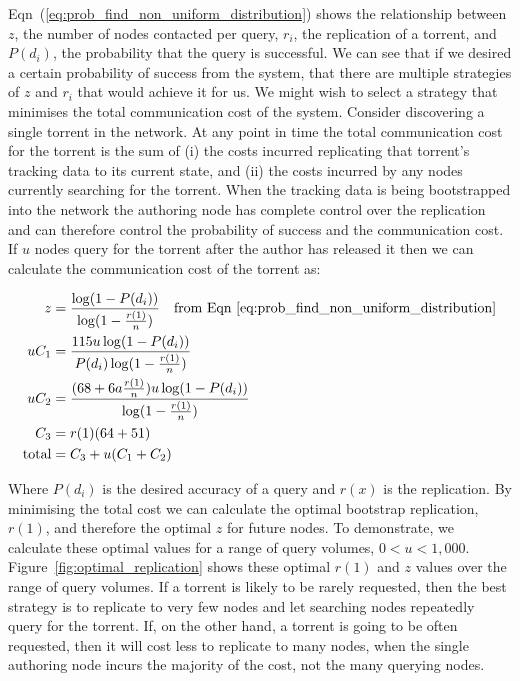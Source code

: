     Eqn~(\ref{eq:prob_find_non_uniform_distribution}) shows the relationship between $z$, the number of nodes contacted per query, $r_i$, the replication of a torrent, and $P(d_i)$, the probability that the query is successful. We can see that if we desired a certain probability of success from the system, that there are multiple strategies of $z$ and $r_i$ that would achieve it for us. We might wish to select a strategy that minimises the total communication cost of the system. Consider discovering a single torrent in the network. At any point in time the total communication cost for the torrent is the sum of (i) the costs incurred replicating that torrent's tracking data to its current state, and (ii) the costs incurred by any nodes currently searching for the torrent. When the tracking data is being bootstrapped into the network the authoring node has complete control over the replication and can therefore control the probability of success and the communication cost. If $u$ nodes query for the torrent after the author has released it then we can calculate the communication cost of the torrent as:

    \begin{align}
                     z &= \frac{\log(1-P(d_i))}{\log(1-\frac{r(1)}{n})} \quad \textrm{from Eqn~\ref{eq:prob_find_non_uniform_distribution}}\\
                  uC_1 &= \frac{115u\log(1-P(d_i))}{P(d_i)\log(1-\frac{r(1)}{n})}\\
                  uC_2 &= \frac{(68 + 6a\frac{r(1)}{n})u\log(1-P(d_i))}{\log(1-\frac{r(1)}{n})} \\
                   C_3 &= r(1)(64+51) \\
        \textrm{total} &= C_3 + u(C_1+C_2)
    \end{align}

    Where $P(d_i)$ is the desired accuracy of a query and $r(x)$ is the replication. By minimising the total cost we can calculate the optimal bootstrap replication, $r(1)$, and therefore the optimal $z$ for future nodes. To demonstrate, we calculate these optimal values for a range of query volumes, $0<u<1,000$. Figure~\ref{fig:optimal_replication} shows these optimal $r(1)$ and $z$ values over the range of query volumes. If a torrent is likely to be rarely requested, then the best strategy is to replicate to very few nodes and let searching nodes repeatedly query for the torrent. If, on the other hand, a torrent is going to be often requested, then it will cost less to replicate to many nodes, when the single authoring node incurs the majority of the cost, not the many querying nodes.

